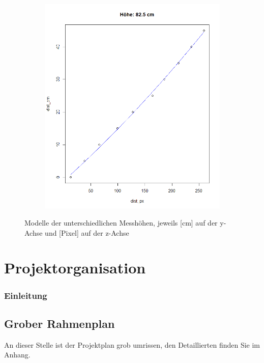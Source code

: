 \documentclass[a4paper]{report}
\begin{document}
\begin{figure}[h]
\begin{subfigure}[b]{0.3\textwidth}
	\end{subfigure}
	\hfill
	\begin{subfigure}[b]{0.3\textwidth}
		\includegraphics[width=\textwidth]{hoehe82_5}
	\end{subfigure}
	\caption{Modelle der unterschiedlichen Messhöhen, jeweils [cm] auf der y-Achse und [Pixel] auf der z-Achse}
	\label{fig:Modelle}
\end{figure}

\chapter{Projektorganisation}
\subsection{Einleitung}

\section{Grober Rahmenplan}
\label{sec:GrobRahmenplan}
An dieser Stelle ist der Projektplan grob umrissen, den Detaillierten finden Sie im Anhang.
\end{document}
